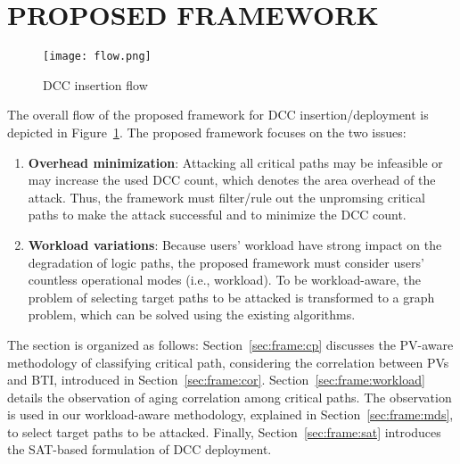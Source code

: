 
\section{PROPOSED FRAMEWORK}
\label{sec:frame}
\begin{figure}
	\centering
	\texttt{[image: flow.png]}
	\caption{DCC insertion flow}
	\label{fig:flow}
\end{figure}
\begin{comment}
\begin{figure}
	\centering
	\texttt{[image: pathset.png]}
	\caption{Classification of critical paths}
	\label{fig:set}
\end{figure}
\end{comment}
The overall flow of the proposed framework for DCC insertion/deployment is depicted in Figure~\ref{fig:flow}. The proposed framework focuses on the two issues: 
\begin{enumerate}
	\item \textbf{Overhead minimization}: Attacking all critical paths may be infeasible or may increase the used DCC count, which denotes the area overhead of the attack. Thus, the framework must filter/rule out the unpromsing critical paths to make the attack successful and to minimize the DCC count. 
	\item \textbf{Workload variations}: Because users' workload have strong impact on the degradation of logic paths, the proposed framework must consider users' countless operational modes (i.e., workload). To be workload-aware, the problem of selecting target paths to be attacked is transformed to a graph problem, which can be solved using the existing algorithms. 
\end{enumerate}


The section is organized as follows: Section~\ref{sec:frame:cp} discusses the PV-aware methodology of classifying critical path, considering the correlation between PVs and BTI, introduced in Section~\ref{sec:frame:cor}. Section~\ref{sec:frame:workload} details the observation of aging correlation among critical paths. The observation is used in our workload-aware methodology, explained in Section~\ref{sec:frame:mds}, to select target paths to be attacked. Finally, Section~\ref{sec:frame:sat} introduces the SAT-based formulation of DCC deployment.

